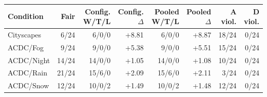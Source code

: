 \begin{tabular}{@{}lrrrrrrr@{}}
\toprule
Condition & Fair & Config. W/T/L & Config. $\Delta$ & Pooled W/T/L & Pooled $\Delta$ & A viol. & D viol. \\
\midrule
Cityscapes & 6/24 & 6/0/0 & +8.81 & 6/0/0 & +8.87 & 18/24 & 0/24 \\
ACDC/Fog & 9/24 & 9/0/0 & +5.38 & 9/0/0 & +5.51 & 15/24 & 0/24 \\
ACDC/Night & 14/24 & 14/0/0 & +1.05 & 14/0/0 & +1.08 & 10/24 & 0/24 \\
ACDC/Rain & 21/24 & 15/6/0 & +2.09 & 15/6/0 & +2.11 & 3/24 & 0/24 \\
ACDC/Snow & 12/24 & 10/0/2 & +1.49 & 10/0/2 & +1.48 & 12/24 & 0/24 \\
\bottomrule
\end{tabular}
